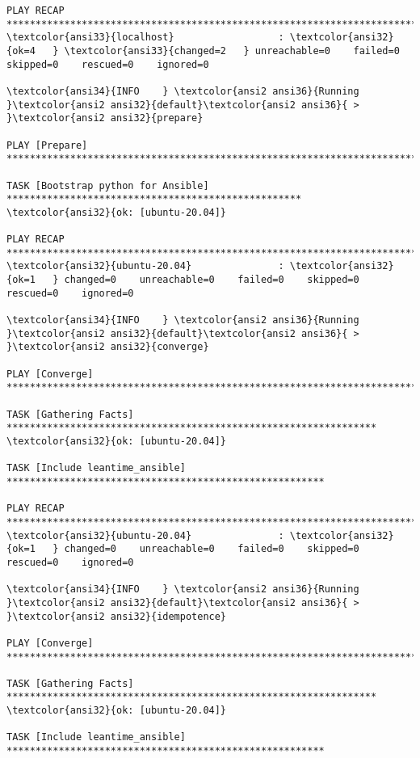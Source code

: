 \documentclass{scrartcl}
\begin{document}
\begin{Verbatim}
PLAY RECAP ****************************************************************************
\textcolor{ansi33}{localhost}                  : \textcolor{ansi32}{ok=4   } \textcolor{ansi33}{changed=2   } unreachable=0    failed=0    skipped=0    rescued=0    ignored=0

\textcolor{ansi34}{INFO    } \textcolor{ansi2 ansi36}{Running }\textcolor{ansi2 ansi32}{default}\textcolor{ansi2 ansi36}{ > }\textcolor{ansi2 ansi32}{prepare}

PLAY [Prepare] ************************************************************************

TASK [Bootstrap python for Ansible] ***************************************************
\textcolor{ansi32}{ok: [ubuntu-20.04]}

PLAY RECAP ****************************************************************************
\textcolor{ansi32}{ubuntu-20.04}               : \textcolor{ansi32}{ok=1   } changed=0    unreachable=0    failed=0    skipped=0    rescued=0    ignored=0

\textcolor{ansi34}{INFO    } \textcolor{ansi2 ansi36}{Running }\textcolor{ansi2 ansi32}{default}\textcolor{ansi2 ansi36}{ > }\textcolor{ansi2 ansi32}{converge}

PLAY [Converge] ***********************************************************************

TASK [Gathering Facts] ****************************************************************
\textcolor{ansi32}{ok: [ubuntu-20.04]}

TASK [Include leantime_ansible] *******************************************************

PLAY RECAP ****************************************************************************
\textcolor{ansi32}{ubuntu-20.04}               : \textcolor{ansi32}{ok=1   } changed=0    unreachable=0    failed=0    skipped=0    rescued=0    ignored=0

\textcolor{ansi34}{INFO    } \textcolor{ansi2 ansi36}{Running }\textcolor{ansi2 ansi32}{default}\textcolor{ansi2 ansi36}{ > }\textcolor{ansi2 ansi32}{idempotence}

PLAY [Converge] ***********************************************************************

TASK [Gathering Facts] ****************************************************************
\textcolor{ansi32}{ok: [ubuntu-20.04]}

TASK [Include leantime_ansible] *******************************************************


\end{Verbatim}
\end{document}
